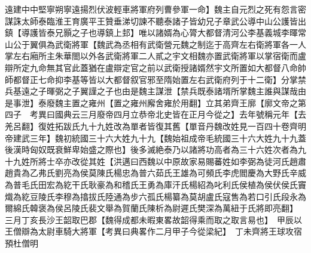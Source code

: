 遠建中中堅寧朔寧遠揚烈伏波輕車將軍府列曹參軍一命】魏主自元烈之死有怨言密謀誅太師泰臨淮王育廣平王贊垂涕切諫不聽泰諸子皆幼兄子章武公導中山公護皆出鎮【導護皆泰兄顥之子也導鎮上邽】唯以諸婿為心膂大都督清河公李基義城李暉常山公于翼俱為武衛將軍【魏武為丞相有武衛營元魏之制迄于高齊左右衛將軍各一人掌左右廂所主朱華閤以外各武衛將軍二人貳之宇文相魏亦置武衛將軍以掌宿衛而盧辯所定九命無其官此蓋猶在盧辯定官之前以武衛授諸婿然宇文所置如大都督八命帥師都督正七命抑李基等皆以大都督叙官邪至隋始置左右武衛府列于十二衛】分掌禁兵基遠之子暉弼之子翼謹之子也由是魏主謀泄【禁兵既泰諸壻所掌魏主誰與謀哉由是事泄】泰廢魏主置之雍州【置之雍州廨舍雍於用翻】立其弟齊王廓【廓文帝之第四子　考異曰國典云三月廢帝四月立恭帝北史皆在正月今從之】去年號稱元年【去羌呂翻】復姓拓跋氏九十九姓改為單者皆復其舊【單音丹魏改姓見一百四十卷齊明帝建武三年】魏初統國三十六大姓九十九【魏始祖成帝毛統國三十六大姓九十九蓋後漢時匈奴既衰鮮卑始盛之際也】後多滅絶泰乃以諸將功高者為三十六姓次者為九十九姓所將士卒亦改從其姓【洪邁曰西魏以中原故家易賜蕃姓如李弼為徒河氏趙肅趙貴為乙弗氏劉亮為侯莫陳氏楊忠為普六茹氏王雄為可頻氏李虎閻慶為大野氏辛威為普毛氏田宏為紇干氏耿豪為和稽氏王勇為庫汗氏楊紹為叱利氏侯植為侯伏侯氏竇熾為紇豆陵氏李穆為㩉拔氏陸通為步六孤氏楊纂為莫胡盧氏寇售為若口引氏段永為爾綿氏韓褒為侯呂陵氏裴文舉為賀蘭氏陳析為尉遲氏樊深為萬紐于氏將即亮翻】　三月丁亥長沙王韶取巴郡【魏得成都未暇東畧故韶得乘而取之取言易也】　甲辰以王僧辯為太尉車騎大將軍【考異曰典畧作二月甲子今從梁紀】　丁未齊將王球攻宿預杜僧明

